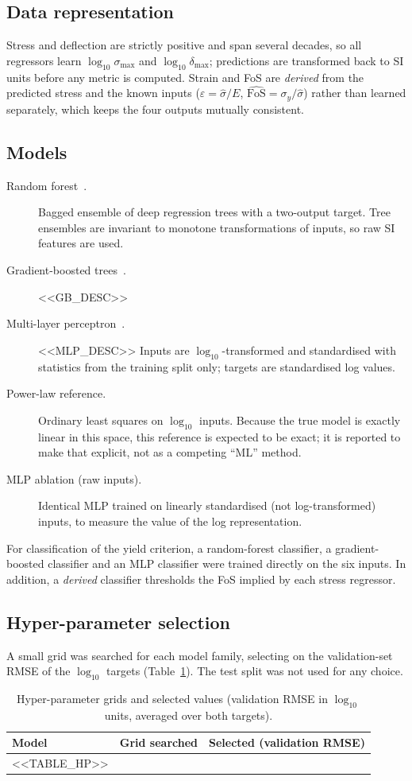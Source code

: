 \documentclass[11pt,a4paper]{article}
\newcommand{\smax}{\sigma_{\max}}
\newcommand{\dmax}{\delta_{\max}}
\begin{document}
\subsection{Data representation}
Stress and deflection are strictly positive and span several decades, so all regressors learn
$\log_{10}\smax$ and $\log_{10}\dmax$; predictions are transformed back to SI units before any metric is computed.
Strain and FoS are \emph{derived} from the predicted stress and the known inputs ($\varepsilon=\hat\sigma/E$,
$\widehat{\mathrm{FoS}}=\sigma_y/\hat\sigma$) rather than learned separately, which keeps the four outputs mutually
consistent.

\subsection{Models}
\begin{description}
\item[Random forest~\cite{breiman2001}.] Bagged ensemble of deep regression trees with a two-output target. Tree
ensembles are invariant to monotone transformations of inputs, so raw SI features are used.
\item[Gradient-boosted trees~\cite{friedman2001}.] <<GB_DESC>>
\item[Multi-layer perceptron~\cite{hornik1989}.] <<MLP_DESC>> Inputs are $\log_{10}$-transformed and standardised
with statistics from the training split only; targets are standardised log values.
\item[Power-law reference.] Ordinary least squares on $\log_{10}$ inputs. Because the true model is exactly linear in
this space, this reference is expected to be exact; it is reported to make that explicit, not as a competing ``ML'' method.
\item[MLP ablation (raw inputs).] Identical MLP trained on linearly standardised (not log-transformed) inputs, to
measure the value of the log representation.
\end{description}
For classification of the yield criterion, a random-forest classifier, a gradient-boosted classifier and an MLP
classifier were trained directly on the six inputs. In addition, a \emph{derived} classifier thresholds the FoS implied by
each stress regressor.

\subsection{Hyper-parameter selection}
A small grid was searched for each model family, selecting on the validation-set RMSE of the $\log_{10}$ targets
(Table~\ref{tab:hp}). The test split was not used for any choice.
\begin{table}[H]\centering\footnotesize
\caption{Hyper-parameter grids and selected values (validation RMSE in $\log_{10}$ units, averaged over both targets).}
\label{tab:hp}
\begin{tabular}{p{2.6cm}p{6.6cm}p{5.4cm}}
\toprule
Model & Grid searched & Selected (validation RMSE)\\
\midrule
<<TABLE_HP>>
\bottomrule
\end{tabular}
\end{table}
\end{document}
